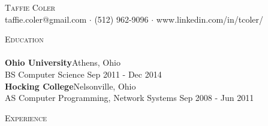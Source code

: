 \documentclass[a4paper]{article}
\newcommand{\lineunder} {
    \vspace*{-8pt} \\
    \hspace*{-18pt} \hrulefill \\
}
\newcommand{\header} [1] {
    {\hspace*{-18pt}\vspace*{6pt} \textsc{#1}}
    \vspace*{-6pt} \lineunder
}
\begin{document}
\vspace*{-40pt}

    

\vspace*{-10pt}
\begin{center}
	{\Huge \scshape {Taffie Coler}}\\
	taffie.coler@gmail.com $\cdot$ (512) 962-9096 $\cdot$ www.linkedin.com/in/tcoler/\\
\end{center}

\header{Education}
\textbf{Ohio University}\hfill Athens, Ohio\\
BS Computer Science \hfill Sep 2011 - Dec 2014\\
\vspace{2mm}
\textbf{Hocking College}\hfill Nelsonville, Ohio\\
AS Computer Programming, Network Systems \hfill Sep 2008 - Jun 2011\\
\vspace{2mm}

\header{Experience}
\vspace{1mm}
\end{document}
